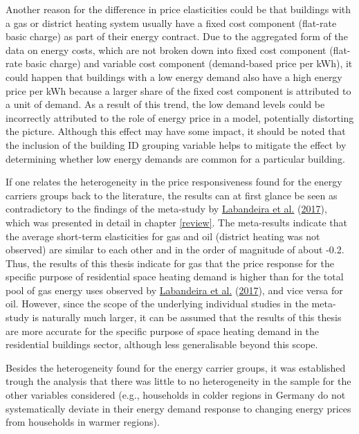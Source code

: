\documentclass[12pt,twoside]{reedthesis}
\begin{document}
Another reason for the difference in price elasticities could be that buildings with a gas or district heating system usually have a fixed cost component (flat-rate basic charge) as part of their energy contract. Due to the aggregated form of the data on energy costs, which are not broken down into fixed cost component (flat-rate basic charge) and variable cost component (demand-based price per kWh), it could happen that buildings with a low energy demand also have a high energy price per kWh because a larger share of the fixed cost component is attributed to a unit of demand. As a result of this trend, the low demand levels could be incorrectly attributed to the role of energy price in a model, potentially distorting the picture. Although this effect may have some impact, it should be noted that the inclusion of the building ID grouping variable helps to mitigate the effect by determining whether low energy demands are common for a particular building.

If one relates the heterogeneity in the price responsiveness found for the energy carriers groups back to the literature, the results can at first glance be seen as contradictory to the findings of the meta-study by \protect\hyperlink{ref-labandeira_etal17}{Labandeira et al.} (\protect\hyperlink{ref-labandeira_etal17}{2017}), which was presented in detail in chapter \ref{review}. The meta-results indicate that the average short-term elasticities for gas and oil (district heating was not observed) are similar to each other and in the order of magnitude of about -0.2. Thus, the results of this thesis indicate for gas that the price response for the specific purpose of residential space heating demand is higher than for the total pool of gas energy uses observed by \protect\hyperlink{ref-labandeira_etal17}{Labandeira et al.} (\protect\hyperlink{ref-labandeira_etal17}{2017}), and vice versa for oil. However, since the scope of the underlying individual studies in the meta-study is naturally much larger, it can be assumed that the results of this thesis are more accurate for the specific purpose of space heating demand in the residential buildings sector, although less generalisable beyond this scope.

Besides the heterogeneity found for the energy carrier groups, it was established trough the analysis that there was little to no heterogeneity in the sample for the other variables considered (e.g., households in colder regions in Germany do not systematically deviate in their energy demand response to changing energy prices from households in warmer regions).
\end{document}

